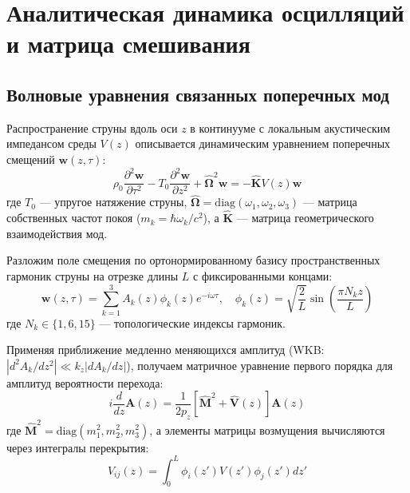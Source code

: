 \documentclass[12pt,a4paper]{article}
\begin{document}
\section{Аналитическая динамика осцилляций и матрица смешивания}

\subsection{Волновые уравнения связанных поперечных мод}
Распространение струны вдоль оси $z$ в континууме с локальным акустическим импедансом среды $V(z)$ описывается динамическим уравнением поперечных смещений $\mathbf{w}(z, \tau)$:
\begin{equation}
	\rho_0 \frac{\partial^2 \mathbf{w}}{\partial \tau^2} - T_0 \frac{\partial^2 \mathbf{w}}{\partial z^2} + \hat{\mathbf{\Omega}}^2 \mathbf{w} = - \hat{\mathbf{K}} V(z) \mathbf{w}
\end{equation}
где $T_0$ — упругое натяжение струны, $\hat{\mathbf{\Omega}} = \text{diag}(\omega_1, \omega_2, \omega_3)$ — матрица собственных частот покоя ($m_k = \hbar \omega_k / c^2$), а $\hat{\mathbf{K}}$ — матрица геометрического взаимодействия мод.

Разложим поле смещения по ортонормированному базису пространственных гармоник струны на отрезке длины $L$ с фиксированными концами:
\begin{equation}
	\mathbf{w}(z, \tau) = \sum_{k=1}^3 A_k(z) \phi_k(z) e^{-i\omega \tau}, \quad \phi_k(z) = \sqrt{\frac{2}{L}} \sin\left( \frac{\pi N_k z}{L} \right)
\end{equation}
где $N_k \in \{1, 6, 15\}$ — топологические индексы гармоник.

Применяя приближение медленно меняющихся амплитуд (WKB: $|d^2 A_k / dz^2| \ll k_z |dA_k/dz|$), получаем матричное уравнение первого порядка для амплитуд вероятности перехода:
\begin{equation}
	i \frac{d}{dz} \mathbf{A}(z) = \frac{1}{2 p_z} \left[ \hat{\mathbf{M}}^2 + \hat{\mathbf{V}}(z) \right] \mathbf{A}(z)
\end{equation}
где $\hat{\mathbf{M}}^2 = \text{diag}(m_1^2, m_2^2, m_3^2)$, а элементы матрицы возмущения вычисляются через интегралы перекрытия:
\begin{equation}
	V_{ij}(z) = \int_0^L \phi_i(z') V(z') \phi_j(z') dz'
\end{equation}
\end{document}
